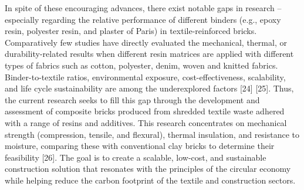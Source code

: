 \noindent In spite of these encouraging advances, there exist notable gaps in research -- especially regarding the relative performance of different binders (e.g., epoxy resin, polyester resin, and plaster of Paris) in textile-reinforced bricks. Comparatively few studies have directly evaluated the mechanical, thermal, or durability-related results when different resin matrices are applied with different types of fabrics such as cotton, polyester, denim, woven and knitted fabrics. Binder-to-textile ratios, environmental exposure, cost-effectiveness, scalability, and life cycle sustainability are among the underexplored factors [24] [25]. Thus, the current research seeks to fill this gap through the development and assessment of composite bricks produced from shredded textile waste adhered with a range of resins and additives. This research concentrates on mechanical strength (compression, tensile, and flexural), thermal insulation, and resistance to moisture, comparing these with conventional clay bricks to determine their feasibility  [26]. The goal is to create a scalable, low-cost, and sustainable construction solution that resonates with the principles of the circular economy while helping reduce the carbon footprint of the textile and construction sectors. 




